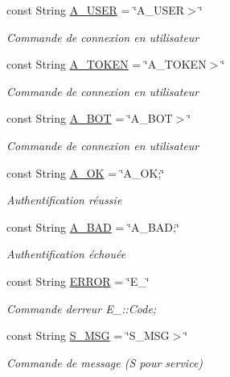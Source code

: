 \begin{DoxyCompactItemize}
const String \mbox{\hyperlink{struct_n_t_k_1_1_n_t_k_commands_a6a108249ba9440928ec8f6fdcaeed15e}{A\+\_\+\+U\+S\+ER}} = \char`\"{}A\+\_\+\+U\+S\+ER$>$\char`\"{}
\begin{DoxyCompactList}\small\item\em Commande de connexion en utilisateur \end{DoxyCompactList}\item 
const String \mbox{\hyperlink{struct_n_t_k_1_1_n_t_k_commands_a8c9c1f2e3c358209630dabc5a889bbe1}{A\+\_\+\+T\+O\+K\+EN}} = \char`\"{}A\+\_\+\+T\+O\+K\+EN$>$\char`\"{}
\begin{DoxyCompactList}\small\item\em Commande de connexion en utilisateur \end{DoxyCompactList}\item 
const String \mbox{\hyperlink{struct_n_t_k_1_1_n_t_k_commands_a5d8654e1359fd7cb2f284dab2713cf4a}{A\+\_\+\+B\+OT}} = \char`\"{}A\+\_\+\+B\+OT$>$\char`\"{}
\begin{DoxyCompactList}\small\item\em Commande de connexion en utilisateur \end{DoxyCompactList}\item 
const String \mbox{\hyperlink{struct_n_t_k_1_1_n_t_k_commands_ad5a9316dcec895692e66e6cc5d98200e}{A\+\_\+\+OK}} = \char`\"{}A\+\_\+\+OK;\char`\"{}
\begin{DoxyCompactList}\small\item\em Authentification réussie \end{DoxyCompactList}\item 
const String \mbox{\hyperlink{struct_n_t_k_1_1_n_t_k_commands_a388ee71163f9457a1474447de4a73c14}{A\+\_\+\+B\+AD}} = \char`\"{}A\+\_\+\+B\+AD;\char`\"{}
\begin{DoxyCompactList}\small\item\em Authentification échouée \end{DoxyCompactList}\item 
const String \mbox{\hyperlink{struct_n_t_k_1_1_n_t_k_commands_a4069e2042c02428360bad186824c9976}{E\+R\+R\+OR}} = \char`\"{}E\+\_\+\char`\"{}
\begin{DoxyCompactList}\small\item\em Commande d\textquotesingle{}erreur E\+\_\+\+::\+Code; \end{DoxyCompactList}\item 
const String \mbox{\hyperlink{struct_n_t_k_1_1_n_t_k_commands_a9fbd7e4ff74bd0102218f94c1c28168e}{S\+\_\+\+M\+SG}} = \char`\"{}S\+\_\+\+M\+SG$>$\char`\"{}
\begin{DoxyCompactList}\small\item\em Commande de message (S pour service) \end{DoxyCompactList}\end{DoxyCompactItemize}


